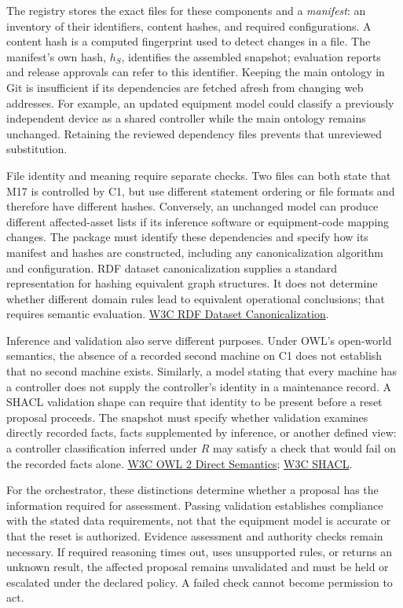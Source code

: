 \documentclass[preprint,12pt,authoryear]{elsarticle}
\begin{document}
The registry stores the exact files for these components and a
\emph{manifest}: an inventory of their identifiers, content hashes, and
required configurations. A content hash is a computed fingerprint used
to detect changes in a file. The manifest's own hash, \(h_S\),
identifies the assembled snapshot; evaluation reports and release
approvals can refer to this identifier. Keeping the main ontology in Git
is insufficient if its dependencies are fetched afresh from changing web
addresses. For example, an updated equipment model could classify a
previously independent device as a shared controller while the main
ontology remains unchanged. Retaining the reviewed dependency files
prevents that unreviewed substitution.

File identity and meaning require separate checks. Two files can both
state that M17 is controlled by C1, but use different statement ordering
or file formats and therefore have different hashes. Conversely, an
unchanged model can produce different affected-asset lists if its
inference software or equipment-code mapping changes. The package must
identify these dependencies and specify how its manifest and hashes are
constructed, including any canonicalization algorithm and configuration.
RDF dataset canonicalization supplies a standard representation for
hashing equivalent graph structures. It does not determine whether
different domain rules lead to equivalent operational conclusions; that
requires semantic evaluation.
\href{https://www.w3.org/TR/rdf-canon/}{W3C RDF Dataset
Canonicalization}.

Inference and validation also serve different purposes. Under OWL's
open-world semantics, the absence of a recorded second machine on C1
does not establish that no second machine exists. Similarly, a model
stating that every machine has a controller does not supply the
controller's identity in a maintenance record. A SHACL validation shape
can require that identity to be present before a reset proposal
proceeds. The snapshot must specify whether validation examines directly
recorded facts, facts supplemented by inference, or another defined
view: a controller classification inferred under \(R\) may satisfy a
check that would fail on the recorded facts alone.
\href{https://www.w3.org/TR/owl2-direct-semantics/}{W3C OWL 2 Direct
Semantics}; \href{https://www.w3.org/TR/shacl/}{W3C SHACL}.

For the orchestrator, these distinctions determine whether a proposal
has the information required for assessment. Passing validation
establishes compliance with the stated data requirements, not that the
equipment model is accurate or that the reset is authorized. Evidence
assessment and authority checks remain necessary. If required reasoning
times out, uses unsupported rules, or returns an unknown result, the
affected proposal remains unvalidated and must be held or escalated
under the declared policy. A failed check cannot become permission to
act.
\end{document}
